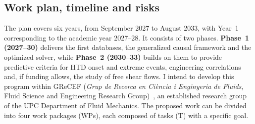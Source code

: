 \documentclass[11pt]{article}
\begin{document}
\subsection{Work plan, timeline and risks}\label{sec:workplan}

The plan covers six years, from September 2027 to August 2033, with Year~1 corresponding to the academic year 2027--28. 
It consists of two phases.
\textbf{Phase~1 (2027--30)} delivers the first databases, the generalized causal framework and the optimized solver, while \textbf{Phase~2 (2030--33)} builds on them to provide predictive criteria for HTD onset and extreme events, engineering correlations and, if funding allows, the study of free shear flows.
I intend to develop this program within GReCEF (\emph{Grup de Recerca en Ci\`encia i Enginyeria de Fluids}, Fluid Science and Engineering Research Group)~\cite{GReCEF}, an established research group of the UPC Department of Fluid Mechanics. 
The proposed work can be divided into four work packages (WPs), each composed of tasks (T) with a specific goal.
\end{document}
